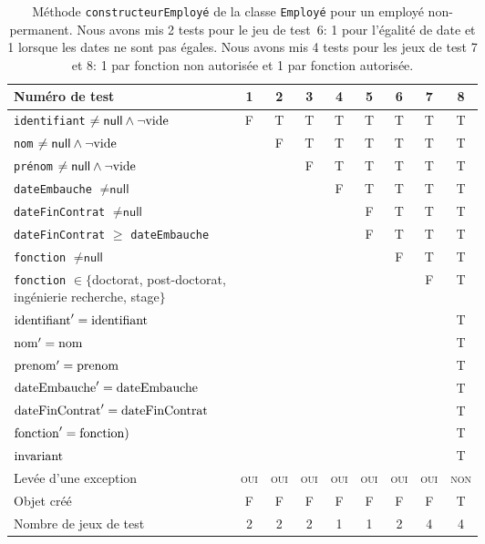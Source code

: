\documentclass[11pt,article]{article}
\newcommand{\nullvalue}{\textsf{null}\xspace}
\newcommand{\invariant}{\ensuremath\mathrm{invariant}}
\begin{document}
\begin{table}[!ht]
\begin{center}
\begin{tabular}{|p{0.6\linewidth}|c|c|c|c|c|c|c|c|}
\hline
Numéro de test
&1&2&3&4&5&6&7&8\\
\hline
\hline
\texttt{identifiant} $\neq \nullvalue \land \neg \emptystring$
&F&T&T&T&T&T&T&T\\
\hline
\texttt{nom} $\neq \nullvalue \land \neg \emptystring$
& &F&T&T&T&T&T&T\\
\hline
\texttt{prénom} $\neq \nullvalue \land \neg \emptystring$
& & &F&T&T&T&T&T\\
\hline
\texttt{dateEmbauche} $\neq \nullvalue$
& & & &F&T&T&T&T\\
\hline
\texttt{dateFinContrat} $\neq \nullvalue$
& & & & &F&T&T&T\\
\hline
\texttt{dateFinContrat} $\geq$ \texttt{dateEmbauche}
& & & & &F&T&T&T\\
\hline
\texttt{fonction} $\neq \nullvalue$
& & & & & &F&T&T\\
\hline
\texttt{fonction} $\in \{$doctorat, post-doctorat, ingénierie
recherche, stage$\}$
& & & & & & &F&T\\
\hline
\hline
$\mathrm{identifiant}' = \mathrm{identifiant}$
& & & & & & & &T\\
\hline
$\mathrm{nom}' = \mathrm{nom}$
& & & & & & & &T\\
\hline
$\mathrm{prenom}' = \mathrm{prenom}$
& & & & & & & &T\\
\hline
$\mathrm{dateEmbauche}' = \mathrm{dateEmbauche}$
& & & & & & & &T\\
\hline
$\mathrm{dateFinContrat}' = \mathrm{dateFinContrat}$
& & & & & & & &T\\
\hline
$\mathrm{fonction}' = \mathrm{fonction})$
& & & & & & & &T\\
\hline
$\invariant$
& & & & & & & &T\\
\hline
Levée d'une exception&\textsc{oui}&\textsc{oui}&\textsc{oui}&\textsc{oui}&\textsc{oui}&\textsc{oui}&\textsc{oui}&\textsc{non}\\
\hline
\hline
Objet créé
&F&F&F&F&F&F&F&T\\
\hline
\hline
Nombre de jeux de test 
&2&2&2&1&1&2&4&4\\
\hline
\end{tabular}
\caption{Méthode \texttt{constructeurEmployé} de la
classe \texttt{Employé} pour un employé non-permanent. Nous avons mis 2
  tests pour le jeu de test~6: 1 pour l'égalité de date et 1 lorsque
  les dates ne sont pas égales. Nous avons mis 4 tests pour les jeux
  de test 7 et 8: 1 par fonction non autorisée et 1 par fonction
  autorisée.}
\end{center}
\end{table}
\end{document}
